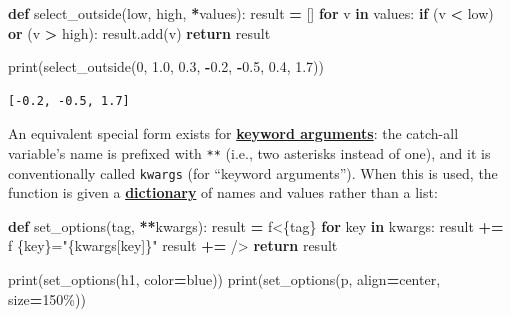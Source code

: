 \documentclass[
]{krantz}
\makeatletter
\newenvironment{Shaded}{\begin{snugshade}}{\end{snugshade}}
\newcommand{\BuiltInTok}[1]{#1}
\newcommand{\ControlFlowTok}[1]{\textcolor[rgb]{0.13,0.29,0.53}{\textbf{#1}}}
\newcommand{\DecValTok}[1]{\textcolor[rgb]{0.00,0.00,0.81}{#1}}
\newcommand{\FloatTok}[1]{\textcolor[rgb]{0.00,0.00,0.81}{#1}}
\newcommand{\KeywordTok}[1]{\textcolor[rgb]{0.13,0.29,0.53}{\textbf{#1}}}
\newcommand{\NormalTok}[1]{#1}
\newcommand{\OperatorTok}[1]{\textcolor[rgb]{0.81,0.36,0.00}{\textbf{#1}}}
\newcommand{\SpecialCharTok}[1]{\textcolor[rgb]{0.00,0.00,0.00}{#1}}
\newcommand{\SpecialStringTok}[1]{\textcolor[rgb]{0.31,0.60,0.02}{#1}}
\newcommand{\StringTok}[1]{\textcolor[rgb]{0.31,0.60,0.02}{#1}}
\newenvironment{kframe}{%
\medskip{}
\setlength{\fboxsep}{.8em}
 \def\at@end@of@kframe{}%
 \ifinner\ifhmode%
  \def\at@end@of@kframe{\end{minipage}}%
  \begin{minipage}{\columnwidth}%
 \fi\fi%
 \def\FrameCommand##1{\hskip\@totalleftmargin \hskip-\fboxsep
 \colorbox{shadecolor}{##1}\hskip-\fboxsep
     \hskip-\linewidth \hskip-\@totalleftmargin \hskip\columnwidth}%
 \MakeFramed {\advance\hsize-\width
   \@totalleftmargin\z@ \linewidth\hsize
   \@setminipage}}%
 {\par\unskip\endMakeFramed%
 \at@end@of@kframe}
\renewenvironment{Shaded}{\begin{kframe}}{\end{kframe}}
\newcommand{\gref}[2]{\hyperlink{#2}{\textbf{#1}}}
\makeatother
\begin{document}
\begin{Shaded}
\begin{Highlighting}[]
\KeywordTok{def}\NormalTok{ select\_outside(low, high, }\OperatorTok{*}\NormalTok{values):}
\NormalTok{    result }\OperatorTok{=}\NormalTok{ []}
    \ControlFlowTok{for}\NormalTok{ v }\KeywordTok{in}\NormalTok{ values:}
        \ControlFlowTok{if}\NormalTok{ (v }\OperatorTok{\textless{}}\NormalTok{ low) }\KeywordTok{or}\NormalTok{ (v }\OperatorTok{\textgreater{}}\NormalTok{ high):}
\NormalTok{            result.add(v)}
    \ControlFlowTok{return}\NormalTok{ result}

\BuiltInTok{print}\NormalTok{(select\_outside(}\DecValTok{0}\NormalTok{, }\FloatTok{1.0}\NormalTok{, }\FloatTok{0.3}\NormalTok{, }\OperatorTok{{-}}\FloatTok{0.2}\NormalTok{, }\OperatorTok{{-}}\FloatTok{0.5}\NormalTok{, }\FloatTok{0.4}\NormalTok{, }\FloatTok{1.7}\NormalTok{))}
\end{Highlighting}
\end{Shaded}

\begin{verbatim}
[-0.2, -0.5, 1.7]
\end{verbatim}

An equivalent special form exists for \gref{keyword arguments}{keyword\_arguments}:
the catch-all variable's name is prefixed with \texttt{**} (i.e., two asterisks instead of one),
and it is conventionally called \texttt{kwargs} (for ``keyword arguments'').
When this is used,
the function is given a \gref{dictionary}{dictionary} of names and values
rather than a list:

\begin{Shaded}
\begin{Highlighting}[]
\KeywordTok{def}\NormalTok{ set\_options(tag, }\OperatorTok{**}\NormalTok{kwargs):}
\NormalTok{    result }\OperatorTok{=} \SpecialStringTok{f\textquotesingle{}\textless{}}\SpecialCharTok{\{}\NormalTok{tag}\SpecialCharTok{\}}\SpecialStringTok{\textquotesingle{}}
    \ControlFlowTok{for}\NormalTok{ key }\KeywordTok{in}\NormalTok{ kwargs:}
\NormalTok{        result }\OperatorTok{+=} \SpecialStringTok{f\textquotesingle{} }\SpecialCharTok{\{}\NormalTok{key}\SpecialCharTok{\}}\SpecialStringTok{="}\SpecialCharTok{\{}\NormalTok{kwargs[key]}\SpecialCharTok{\}}\SpecialStringTok{"\textquotesingle{}}
\NormalTok{    result }\OperatorTok{+=} \StringTok{\textquotesingle{}/\textgreater{}\textquotesingle{}}
    \ControlFlowTok{return}\NormalTok{ result}

\BuiltInTok{print}\NormalTok{(set\_options(}\StringTok{\textquotesingle{}h1\textquotesingle{}}\NormalTok{, color}\OperatorTok{=}\StringTok{\textquotesingle{}blue\textquotesingle{}}\NormalTok{))}
\BuiltInTok{print}\NormalTok{(set\_options(}\StringTok{\textquotesingle{}p\textquotesingle{}}\NormalTok{, align}\OperatorTok{=}\StringTok{\textquotesingle{}center\textquotesingle{}}\NormalTok{, size}\OperatorTok{=}\StringTok{\textquotesingle{}150\%\textquotesingle{}}\NormalTok{))}
\end{Highlighting}
\end{Shaded}
\end{document}
